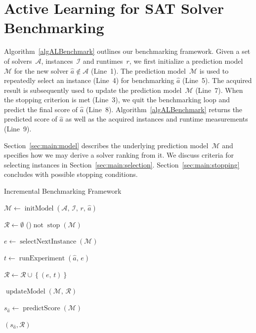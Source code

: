 \documentclass[runningheads]{llncs}
\begin{document}
\section{Active Learning for SAT Solver Benchmarking}
\label{sec:main}

Algorithm~\ref{algALBenchmark} outlines our benchmarking framework. 
Given a set of solvers~$\mathcal{A}$, instances~$\mathcal{I}$ and runtimes~$r$, we first initialize a prediction model~$\mathcal{M}$ for the new solver $\hat a \not\in \mathcal{A}$ (Line~1).
The prediction model~$\mathcal{M}$ is used to repeatedly select an instance (Line~4) for benchmarking $\hat a$ (Line~5). 
The acquired result is subsequently used to update the prediction model~$\mathcal{M}$ (Line~7). 
When the stopping criterion is met (Line~3), we quit the benchmarking loop and predict the final score of $\hat a$ (Line~8). 
Algorithm~\ref{algALBenchmark} returns the predicted score of $\hat a$ as well as the acquired instances and runtime measurements (Line~9). 

Section~\ref{sec:main:model} describes the underlying prediction model~$\mathcal{M}$ and specifies how we may derive a solver ranking from it.
We discuss criteria for selecting instances in Section~\ref{sec:main:selection}.
Section~\ref{sec:main:stopping} concludes with possible stopping conditions.

\begin{algorithm}[t]
  \caption{Incremental Benchmarking Framework}
  \label{algALBenchmark}


  \BlankLine

  $\mathcal{M} \leftarrow \operatorname{initModel}\left(\mathcal{A},\, \mathcal{I},\, r,\, \hat{a}\right)$ 
  
  \BlankLine
  $\mathcal{R} \leftarrow \emptyset$ \;
  \While(){$\operatorname{not} \operatorname{stop}\left(\mathcal{M}\right)$}{
    $e \leftarrow \operatorname{selectNextInstance}\left(\mathcal{M}\right)$ 

    $t \leftarrow \operatorname{runExperiment}\left(\hat{a},\,  e\right)$  

    $\mathcal{R} \leftarrow \mathcal{R} \cup \left\lbrace (e,\, t) \right\rbrace$

    \BlankLine
    $\operatorname{updateModel}\left(\mathcal{M},\, \mathcal{R}\right)$ 
  }
  $s_{\hat a} \leftarrow \operatorname{predictScore}(\mathcal{M})$ 
  
  \BlankLine
  \Return $(s_{\hat a}, \mathcal{R})$
\end{algorithm}
\end{document}
